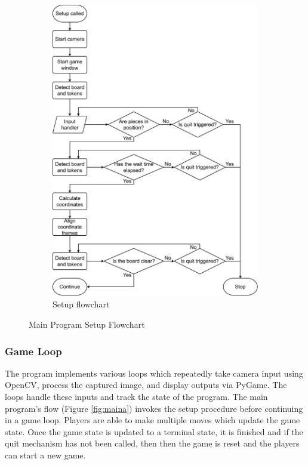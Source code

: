\documentclass[12pt]{article}
\begin{document}
\begin{figure}[H]
    \ContinuedFloat
    \begin{subfigure}{1\textwidth}
        \includegraphics[width=\textwidth]{images/figures/fig6b}
        \caption{Setup flowchart}
        \label{fig:mainb}
    \end{subfigure}
    
    \caption{Main Program Setup Flowchart}
    \label{fig:main}
\end{figure}

\subsubsection{Game Loop}
The program implements various loops which repeatedly take camera input using OpenCV, process the captured image, and display outputs via PyGame. 
The loops handle these inputs and track the state of the program. 
The main program's flow (Figure \ref{fig:maina}) invokes the setup procedure before continuing in a game loop.
Players are able to make multiple moves which update the game state.
Once the game state is updated to a terminal state, it is finished and if the quit mechanism has not been called, then then the game is reset and the players can start a new game. 
\end{document}

